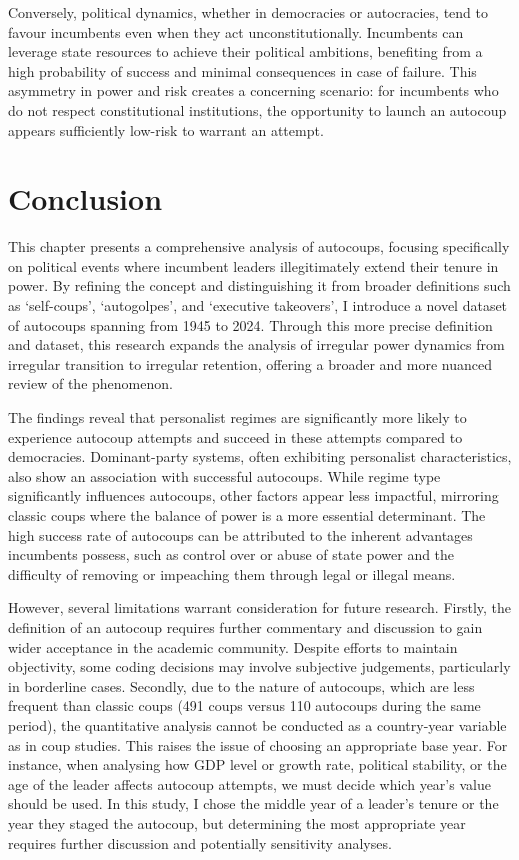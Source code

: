 \documentclass[
  12pt,
]{report}
\begin{document}
Conversely, political dynamics, whether in democracies or autocracies,
tend to favour incumbents even when they act unconstitutionally.
Incumbents can leverage state resources to achieve their political
ambitions, benefiting from a high probability of success and minimal
consequences in case of failure. This asymmetry in power and risk
creates a concerning scenario: for incumbents who do not respect
constitutional institutions, the opportunity to launch an autocoup
appears sufficiently low-risk to warrant an attempt.

\section{Conclusion}\label{conclusion-1}

This chapter presents a comprehensive analysis of autocoups, focusing
specifically on political events where incumbent leaders illegitimately
extend their tenure in power. By refining the concept and distinguishing
it from broader definitions such as `self-coups', `autogolpes', and
`executive takeovers', I introduce a novel dataset of autocoups spanning
from 1945 to 2024. Through this more precise definition and dataset,
this research expands the analysis of irregular power dynamics from
irregular transition to irregular retention, offering a broader and more
nuanced review of the phenomenon.

The findings reveal that personalist regimes are significantly more
likely to experience autocoup attempts and succeed in these attempts
compared to democracies. Dominant-party systems, often exhibiting
personalist characteristics, also show an association with successful
autocoups. While regime type significantly influences autocoups, other
factors appear less impactful, mirroring classic coups where the balance
of power is a more essential determinant. The high success rate of
autocoups can be attributed to the inherent advantages incumbents
possess, such as control over or abuse of state power and the difficulty
of removing or impeaching them through legal or illegal means.

However, several limitations warrant consideration for future research.
Firstly, the definition of an autocoup requires further commentary and
discussion to gain wider acceptance in the academic community. Despite
efforts to maintain objectivity, some coding decisions may involve
subjective judgements, particularly in borderline cases. Secondly, due
to the nature of autocoups, which are less frequent than classic coups
(491 coups versus 110 autocoups during the same period), the
quantitative analysis cannot be conducted as a country-year variable as
in coup studies. This raises the issue of choosing an appropriate base
year. For instance, when analysing how GDP level or growth rate,
political stability, or the age of the leader affects autocoup attempts,
we must decide which year's value should be used. In this study, I chose
the middle year of a leader's tenure or the year they staged the
autocoup, but determining the most appropriate year requires further
discussion and potentially sensitivity analyses.
\end{document}
